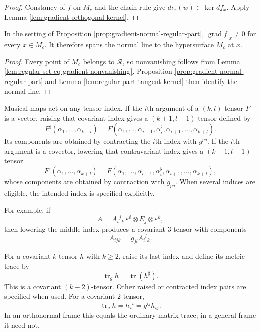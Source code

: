 \begin{proof}
\leanok
{}
\sketch Constancy of $f$ on $M_c$ and the chain rule give
$d\iota_x(w)\in\ker df_x$. Apply Lemma
\ref{lem:gradient-orthogonal-kernel}.
\end{proof}

\begin{lemma}
\label{lem:gradient-nonvanishing-regular-part}
\leanok
{}
In the setting of Proposition \ref{prop:gradient-normal-regular-part},
$\operatorname{grad}f|_x\ne0$ for every $x\in M_c$. It therefore spans the normal
line to the hypersurface $M_c$ at $x$.
\end{lemma}

\begin{proof}
\leanok
{}
\sketch Every point of $M_c$ belongs to $\mathcal R$, so nonvanishing follows from
Lemma \ref{lem:regular-set-eq-gradient-nonvanishing}. Proposition
\ref{prop:gradient-normal-regular-part} and Lemma
\ref{lem:regular-part-tangent-kernel} then identify the normal line.
\end{proof}

Musical maps act on any tensor index. If the $i$th argument of a $(k,l)$-tensor
$F$ is a vector, raising that covariant index gives a $(k+1,l-1)$-tensor defined by
\[
F^\sharp(\alpha_1,\ldots,\alpha_{k+l})
=F(\alpha_1,\ldots,\alpha_{i-1},\alpha_i^\sharp,
   \alpha_{i+1},\ldots,\alpha_{k+l}).
\]
Its components are obtained by contracting the $i$th index with $g^{pq}$. If the
$i$th argument is a covector, lowering that contravariant index gives a
$(k-1,l+1)$-tensor
\[
F^\flat(\alpha_1,\ldots,\alpha_{k+l})
=F(\alpha_1,\ldots,\alpha_{i-1},\alpha_i^\flat,
   \alpha_{i+1},\ldots,\alpha_{k+l}),
\]
whose components are obtained by contraction with $g_{pq}$. When several indices
are eligible, the intended index is specified explicitly.

For example, if
\[
A=A_i{}^j{}_k\,\varepsilon^i\otimes E_j\otimes\varepsilon^k,
\]
then lowering the middle index produces a covariant $3$-tensor with components
\[
A_{ijk}=g_{jl}A_i{}^l{}_k.
\]

For a covariant $k$-tensor $h$ with $k\ge2$, raise its last index and define its
metric trace by
\[
\operatorname{tr}_gh=\operatorname{tr}(h^\sharp).
\]
This is a covariant $(k-2)$-tensor. Other raised or contracted index pairs are
specified when used. For a covariant $2$-tensor,
\[
\operatorname{tr}_gh=h_i{}^i=g^{ij}h_{ij}.
\]
In an orthonormal frame this equals the ordinary matrix trace; in a general frame
it need not.


